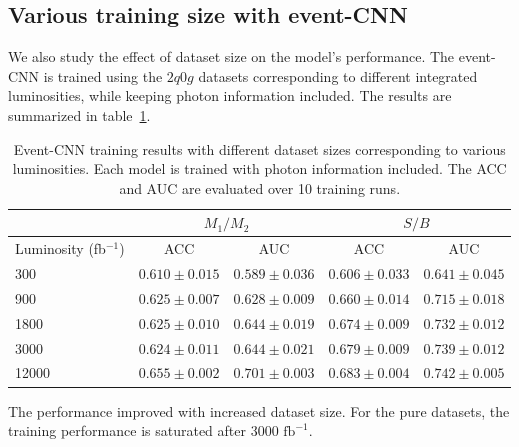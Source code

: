 \documentclass[12pt]{article}
\begin{document}
    \subsection{Various training size with event-CNN}%
    \label{sub:various_training_size_with_event_cnn}
        We also study the effect of dataset size on the model's performance. The event-CNN is trained using the $2q0g$ datasets corresponding to different integrated luminosities, while keeping photon information included. The results are summarized in table~\ref{tab:CWoLa_event_CNN_training_results_3000_jet_tagging_L_3000_12000}.
        \begin{table}[htpb]
            \centering
            \caption{Event-CNN training results with different dataset sizes corresponding to various luminosities. Each model is trained with photon information included. The ACC and AUC are evaluated over 10 training runs.}
            \label{tab:CWoLa_event_CNN_training_results_3000_jet_tagging_L_3000_12000}
            \begin{tabular}{l|cc|cc}
                                        & \multicolumn{2}{c|}{$M_1 / M_2$}      & \multicolumn{2}{c}{$S / B$}           \\ \hline
                Luminosity (fb$^{-1}$)  & ACC               & AUC               & ACC               & AUC               \\ \hline
                300                     & $0.610 \pm 0.015$ & $0.589 \pm 0.036$ & $0.606 \pm 0.033$ & $0.641 \pm 0.045$ \\
                900                     & $0.625 \pm 0.007$ & $0.628 \pm 0.009$ & $0.660 \pm 0.014$ & $0.715 \pm 0.018$ \\
                1800                    & $0.625 \pm 0.010$ & $0.644 \pm 0.019$ & $0.674 \pm 0.009$ & $0.732 \pm 0.012$ \\
                3000                    & $0.624 \pm 0.011$ & $0.644 \pm 0.021$ & $0.679 \pm 0.009$ & $0.739 \pm 0.012$ \\
                12000                   & $0.655 \pm 0.002$ & $0.701 \pm 0.003$ & $0.683 \pm 0.004$ & $0.742 \pm 0.005$
            \end{tabular}
        \end{table}
        The performance improved with increased dataset size. For the pure datasets, the training performance is saturated after $3000 \text{ fb}^{-1}$.




\end{document}

